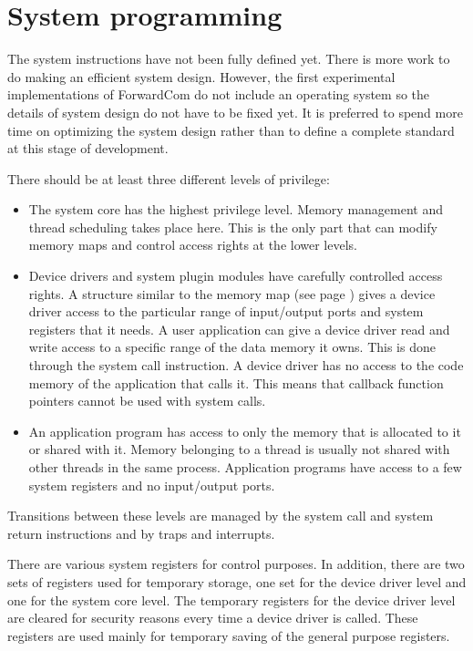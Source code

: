 \documentclass[forwardcom.tex]{subfiles}
\begin{document}
\RaggedRight

\chapter{System programming}

The system instructions have not been fully defined yet. There is more work to do making an efficient system design. However, the first experimental implementations of ForwardCom do not include an operating system so the details of system design do not have to be fixed yet. It is preferred to spend more time on optimizing the system design rather than to define a complete standard at this stage of development.
\vspace{2mm}

There should be at least three different levels of privilege:
\begin{itemize}
\item The system core has the highest privilege level. Memory management and thread scheduling takes place here. This is the only part that can modify memory maps and control access rights at the lower levels.

\item Device drivers and system plugin modules have carefully controlled access rights. A structure similar to the memory map (see page \pageref{memoryManagement}) gives a device driver access to the particular range of input/output ports and system registers that it needs. A user application can give a device driver read and write access to a specific range of the data memory it owns. This is done through the system call instruction. A device driver has no access to the code memory of the application that calls it. This means that callback function pointers cannot be used with system calls.

\item An application program has access to only the memory that is allocated to it or shared with it. Memory belonging to a thread is usually not shared with other threads in the same process. Application programs have access to a few system registers and no input/output ports.

\end{itemize}

Transitions between these levels are managed by the system call and system return instructions and by traps and interrupts.
\vspace{2mm}

There are various system registers for control purposes. In addition, there are two sets of registers used for temporary storage, one set for the device driver level and one for the system core level. The temporary registers for the device driver level are cleared for security reasons every time a device driver is called. These registers are used mainly for temporary saving of the general purpose registers.
\end{document}
